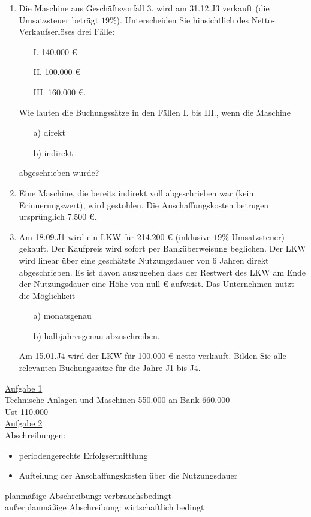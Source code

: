 \documentclass[paper=a4, fontsize=11pt]{scrartcl}
\numberwithin{equation}{section}
\numberwithin{figure}{section}
\numberwithin{table}{section}
\begin{document}
\begin{enumerate}
\item Die Maschine aus Geschäftsvorfall 3. wird am 31.12.J3 verkauft (die Umsatzsteuer beträgt $19  \%$). Unterscheiden Sie hinsichtlich des Netto-Verkaufserlöses drei Fälle:
\begin{itemize}
\item[I.] 140.000 €   
\item[II.] 100.000 €   
\item[III.] 160.000 €.
\end{itemize} Wie lauten die Buchungssätze in den Fällen I. bis III., wenn die Maschine 
\begin{itemize}
\item[a)] direkt
\item[b)] indirekt
\end{itemize} 
abgeschrieben wurde? 
\item Eine Maschine, die bereits indirekt voll abgeschrieben war (kein Erinnerungswert), wird gestohlen. Die Anschaffungskosten betrugen ursprünglich 7.500 €.   
\item Am 18.09.J1 wird ein LKW für 214.200 € (inklusive $19 \%$ Umsatzsteuer) gekauft. Der Kaufpreis wird sofort per Banküberweisung beglichen. Der LKW wird linear über eine geschätzte Nutzungsdauer von 6 Jahren direkt abgeschrieben. Es ist davon auszugehen dass der Restwert des LKW am Ende der Nutzungsdauer eine Höhe von null € aufweist. Das Unternehmen nutzt die Möglichkeit 
\begin{itemize}
\item[a)] monatsgenau 
\item[b)] halbjahresgenau abzuschreiben.
\end{itemize}  
Am 15.01.J4 wird der LKW für 100.000 € netto verkauft. Bilden Sie alle relevanten Buchungssätze für die Jahre J1 bis J4.
\end{enumerate}

\underline{Aufgabe 1} \\
Technische Anlagen und Maschinen 550.000 an Bank 660.000 \\
Ust 110.000 \\

\underline{Aufgabe 2} \\
Abschreibungen: \begin{itemize}
\item periodengerechte Erfolgsermittlung
\item Aufteilung der Anschaffungskosten über die Nutzungsdauer
\end{itemize}
planmäßige Abschreibung: verbrauchsbedingt \\
außerplanmäßige Abschreibung: wirtschaftlich bedingt \\
\end{document}
